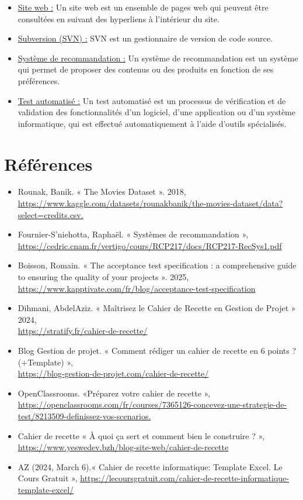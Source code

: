\documentclass[a4paper,12pt]{report}
\begin{document}
\begin{itemize}
    \item \underline{Site web :} Un site web est un ensemble de pages web qui peuvent être consultées en suivant des hyperliens à l'intérieur du site.
    \item \underline{Subversion (SVN) :} SVN est un gestionnaire de version de code source.
    \item \underline{Système de recommandation :} Un système de recommandation est un système qui permet de proposer des contenus ou des produits en fonction de ses préférences.
    \item \underline{Test automatisé :} Un test automatisé est un processus de vérification et de validation des fonctionnalités d'un logiciel, d'une application ou d'un système informatique, qui est effectué automatiquement à l'aide d'outils spécialisés.
\end{itemize}

\chapter*{Références}
\begin{itemize}
    \item Rounak,  Banik. « The Movies Dataset ». 2018,\\ \url{https://www.kaggle.com/datasets/rounakbanik/the-movies-dataset/data?select=credits.csv.}
    \item Fournier-S’niehotta, Raphaël. « Systèmes de recommandation »,\\
    \url{https://cedric.cnam.fr/vertigo/cours/RCP217/docs/RCP217-RecSys1.pdf}
    \item Boisson, Romain. « The acceptance test specification : a comprehensive guide to ensuring the quality of your projects ». 2025,\\
    \url{https://www.kapptivate.com/fr/blog/acceptance-test-specification} 
    \item Dihmani, AbdelAziz. « Maîtrisez le Cahier de Recette en Gestion de Projet » 2024,\\
    \url{https://stratify.fr/cahier-de-recette/} 
    \item Blog Gestion de projet. « Comment rédiger un cahier de recette en 6 points ? (+Template) »,\\
    \url{https://blog-gestion-de-projet.com/cahier-de-recette/}
    \item OpenClassrooms. «Préparez votre cahier de recette »,  \\
    \url {https://openclassrooms.com/fr/courses/7365126-concevez-une-strategie-de-test/8213509-definissez-vos-scenarios.}
    \item Cahier de recette « À quoi ça sert et comment bien le construire ? »,\\
    \url{https://www.yeswedev.bzh/blog-site-web/cahier-de-recette}
    \item AZ (2024, March 6).« Cahier de recette informatique: Template Excel. Le Cours Gratuit »,
    \url{https://lecoursgratuit.com/cahier-de-recette-informatique-template-excel/}

\end{itemize}
\end{document}
